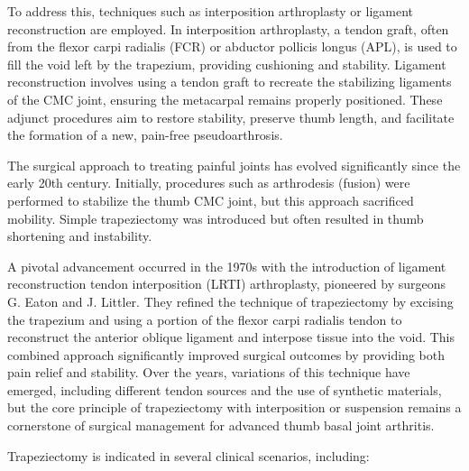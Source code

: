 To address this, techniques such as interposition arthroplasty or ligament reconstruction are employed. In interposition arthroplasty, a tendon graft, often from the flexor carpi radialis (FCR) or abductor pollicis longus (APL), is used to fill the void left by the trapezium, providing cushioning and stability. Ligament reconstruction involves using a tendon graft to recreate the stabilizing ligaments of the CMC joint, ensuring the metacarpal remains properly positioned. These adjunct procedures aim to restore stability, preserve thumb length, and facilitate the formation of a new, pain-free pseudoarthrosis.

The surgical approach to treating painful joints has evolved significantly since the early 20th century. Initially, procedures such as arthrodesis (fusion) were performed to stabilize the thumb CMC joint, but this approach sacrificed mobility. Simple trapeziectomy was introduced but often resulted in thumb shortening and instability.

A pivotal advancement occurred in the 1970s with the introduction of ligament reconstruction tendon interposition (LRTI) arthroplasty, pioneered by surgeons G. Eaton and J. Littler. They refined the technique of trapeziectomy by excising the trapezium and using a portion of the flexor carpi radialis tendon to reconstruct the anterior oblique ligament and interpose tissue into the void. This combined approach significantly improved surgical outcomes by providing both pain relief and stability. Over the years, variations of this technique have emerged, including different tendon sources and the use of synthetic materials, but the core principle of trapeziectomy with interposition or suspension remains a cornerstone of surgical management for advanced thumb basal joint arthritis.

Trapeziectomy is indicated in several clinical scenarios, including:

